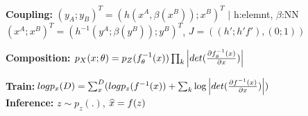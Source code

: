 \textbf{Coupling:} $(y_A; y_B)^T = (h(x^A, \beta(x^B)); x^B)^T$  $|$ h:elemnt, $\beta$:NN\\
$(x^A; x^B)^T = (h^{-1}(y^A; \beta(y^B)); y^B)^T$, $J = ((h'; h'f'),(0;1))$\\

\textbf{Composition:} $p_X(x; \theta) = p_Z(f_\theta^{-1}(x)) \prod_k \left\lvert det(\frac{\partial f_\theta^{-1}(x)}{\partial x}) \right\rvert$\\

\textbf{Train:}$log p_x(D) = \sum_{x}^{D} (log p_z(f^{-1}(x)) +  \sum_k \log \left\lvert det(\frac{\partial f^{-1}(x)}{\partial x}) \right\rvert)$\\
\textbf{Inference:} $z \sim p_z(.)$, $\widehat{x} = f(z)$\\


